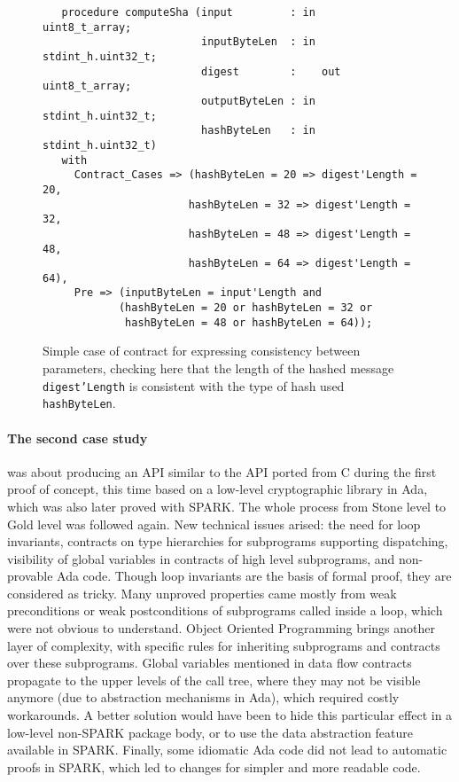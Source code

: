 \documentclass{eceasst}
\begin{document}
\begin{figure}
\begin{lstlisting}
   procedure computeSha (input         : in     uint8_t_array;
                         inputByteLen  : in     stdint_h.uint32_t;
                         digest        :    out uint8_t_array;
                         outputByteLen : in     stdint_h.uint32_t;
                         hashByteLen   : in     stdint_h.uint32_t)
   with
     Contract_Cases => (hashByteLen = 20 => digest'Length = 20,
                       hashByteLen = 32 => digest'Length = 32,
                       hashByteLen = 48 => digest'Length = 48,
                       hashByteLen = 64 => digest'Length = 64),
     Pre => (inputByteLen = input'Length and
            (hashByteLen = 20 or hashByteLen = 32 or
             hashByteLen = 48 or hashByteLen = 64));
\end{lstlisting}
\caption{Simple case of contract for expressing consistency between parameters,
  checking here that the length of the hashed message \texttt{digest'Length} is
  consistent with the type of hash used \texttt{hashByteLen}.}
\label{fig:crypto-case}
\end{figure}

\paragraph{The second case study} was about producing an API similar to the API ported from C
during the first proof of concept, this time based on a low-level cryptographic
library in Ada, which was also later proved with SPARK. The whole process from
Stone level to Gold level was followed again. New technical
issues arised: the need for loop invariants, contracts on type hierarchies for
subprograms supporting dispatching, visibility of global variables in contracts
of high level subprograms, and non-provable Ada code. Though loop invariants are
the basis of formal proof, they are considered as tricky. Many unproved
properties came mostly from weak preconditions or weak postconditions of
subprograms called inside a loop, which were not obvious to understand. Object
Oriented Programming brings another layer of complexity, with specific rules
for inheriting subprograms and contracts over these subprograms. Global
variables mentioned in data flow contracts propagate to the upper levels of the
call tree, where they may not be visible anymore (due to abstraction mechanisms in Ada),
which required costly
workarounds. A better solution would have been to hide this particular effect
in a low-level non-SPARK package body, or to use the data abstraction feature
available in SPARK. Finally, some idiomatic Ada code did not lead to automatic
proofs in SPARK, which led to changes for
simpler and more readable code.
\end{document}
